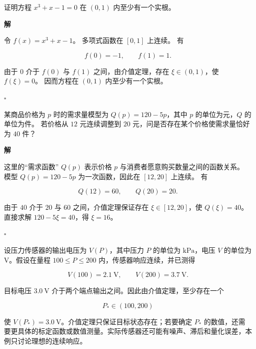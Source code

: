 \documentclass[fontset=fandol]{ctexart}
\newenvironment{solution}{\par\noindent\textbf{解}\quad}{\hfill$\square$\par\vspace{0.8em}}
\begin{document}
\begin{example}

证明方程 $x^3+x-1=0$ 在 $(0,1)$ 内至少有一个实根。

\end{example}

\begin{solution}

令 $f(x)=x^3+x-1$。 多项式函数在 $[0,1]$ 上连续。 有

\[

f(0)=-1,\qquad f(1)=1.

\]

由于 $0$ 介于 $f(0)$ 与 $f(1)$ 之间，由介值定理，存在 $\xi\in(0,1)$，使 $f(\xi)=0$。 因而方程在 $(0,1)$ 内至少有一个实根。

\end{solution}



\begin{example}

某商品价格为 $p$ 时的需求量模型为 $Q(p)=120-5p$，其中 $p$ 的单位为元，$Q$ 的单位为件。 若价格从 $12$ 元连续调整到 $20$ 元，问是否存在某个价格使需求量恰好为 $40$ 件？

\end{example}

\begin{solution}

这里的“需求函数” $Q(p)$ 表示价格 $p$ 与消费者愿意购买数量之间的函数关系。 模型 $Q(p)=120-5p$ 为一次函数，因此在 $[12,20]$ 上连续。 有

\[

Q(12)=60,\qquad Q(20)=20.

\]

由于 $40$ 介于 $20$ 与 $60$ 之间，介值定理保证存在 $\xi\in[12,20]$，使 $Q(\xi)=40$。 直接求解 $120-5\xi=40$，得 $\xi=16$。

\end{solution}



\begin{application}[工程：传感器标定与介值定理]

设压力传感器的输出电压为 $V(P)$，其中压力 $P$ 的单位为 $\mathrm{kPa}$，电压 $V$ 的单位为 $\mathrm V$。假设在量程 $100\leq P\leq200$ 内，传感器响应连续，并已测得

\[

V(100)=2.1\ \mathrm V,\qquad V(200)=3.7\ \mathrm V.

\]

目标电压 $3.0\ \mathrm V$ 介于两个端点输出之间。因此由介值定理，至少存在一个

\[

P_*\in(100,200)

\]

使 $V(P_*)=3.0\ \mathrm V$。介值定理只保证目标状态存在；若要确定 $P_*$ 的数值，还需要更具体的标定函数或数值测量。实际传感器还可能有噪声、滞后和量化误差，本例只讨论理想的连续响应。

\end{application}
\end{document}
